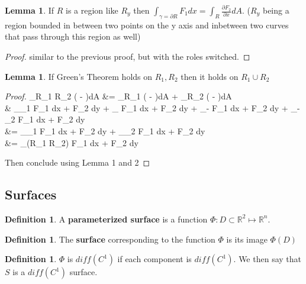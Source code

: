 \documentclass[12pt]{article}
\theoremstyle{plain}
\theoremstyle{definition}
\newtheorem{definition}[theorem]{Definition}
\newtheorem{lemma}[theorem]{Lemma}
\begin{document}
\begin{lemma}
	If $R$ is a region like $R_y$ then $\int_{\gamma = \partial R} F_1 dx = \int_R \frac{\partial F_2}{\partial x} dA$. ($R_y$ being a region bounded in between two points on the y axis and inbetween two curves that pass through this region as well)
\end{lemma}

\begin{proof}
	similar to the previous proof, but with the roles switched.
\end{proof}

\begin{lemma}
	If Green's Theorem holds on $R_1, R_2$ then it holds on $R_1 \cup R_2$
\end{lemma}

\begin{proof}
	\int_{R_1 \cup R_2} ( - )dA &= \int_{R_1} ( - )dA + \int_{R_2} ( - )dA\\
	& \int_{\gamma_1} F_1 dx + F_2 dy + \int_{\sigma} F_1 dx + F_2 dy + \int_{-\sigma} F_1 dx + F_2 dy + \int_{-\gamma_2} F_1 dx + F_2 dy\\
	&= \int_{\gamma_1} F_1 dx + F_2 dy + \int_{\gamma_2} F_1 dx + F_2 dy\\
	&= \int_{\partial (R_1 \cup R_2)} F_1 dx + F_2 dy

	Then conclude using Lemma 1 and 2
\end{proof}

\subsection{Surfaces}

\begin{definition}
	A \textbf{parameterized surface} is a function $\Phi : D \subset \mathbb{R}^2 \mapsto \mathbb{R}^n$.
\end{definition}

\begin{definition}
	The \textbf{surface} corresponding to the function $\Phi$ is its image $\Phi (D)$
\end{definition}

\begin{definition}
	$\Phi$ is $diff(C^1)$ if each component is $diff(C^1)$. We then say that $S$ is a $diff(C^1)$ surface.
\end{definition}
\end{document}
